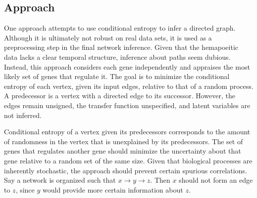 \documentclass[a4paper,12pt]{book}
\theoremstyle{break}
\begin{document}
 \subsection*{Approach}
 
 One approach attempts to use conditional entropy to infer a directed graph. Although it is ultimately not robust on real data sets, it is used as a preprocessing step in the final network inference. Given that the hemapoeitic data lacks a clear temporal structure, inference about paths seem dubious. Instead, this approach considers each gene independently and appraises the most likely set of genes that regulate it. The goal is to minimize the conditional entropy of each vertex, given its input edges, relative to that of a random process. A predecessor is a vertex with a directed edge to its successor. However, the edges remain unsigned, the transfer function unspecified, and latent variables are not inferred.
 
 Conditional entropy of a vertex given its predecessors corresponds to the amount of randomness in the vertex that is unexplained by its predecessors. The set of genes that regulates another gene should minimize the uncertainty about that gene relative to a random set of the same size. Given that biological processes are inherently stochastic, the approach should prevent certain spurious correlations. Say a network is organized such that $x \rightarrow y \rightarrow z$. Then $x$ should not form an edge to $z$, since $y$ would provide more certain information about $z$.
 
\end{document}
